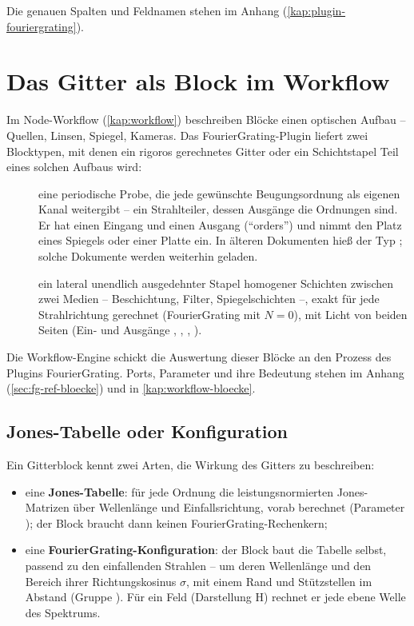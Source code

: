 Die genauen Spalten und Feldnamen stehen im Anhang (\autoref{kap:plugin-fouriergrating}).

\section{Das Gitter als Block im Workflow}\label{sec:fg-block}

Im Node-Workflow (\autoref{kap:workflow}) beschreiben Blöcke einen optischen Aufbau -- Quellen,
Linsen, Spiegel, Kameras. Das FourierGrating-Plugin liefert zwei Blocktypen, mit denen ein
rigoros gerechnetes Gitter oder ein Schichtstapel Teil eines solchen Aufbaus wird:

\begin{description}
  \item[] eine periodische Probe, die jede gewünschte Beugungsordnung als eigenen
    Kanal weitergibt -- ein Strahlteiler, dessen Ausgänge die Ordnungen sind. Er hat einen Eingang
     und einen Ausgang  (\enquote{orders}) und nimmt den Platz eines Spiegels
    oder einer Platte ein. In älteren Dokumenten hieß der Typ ; solche Dokumente
    werden weiterhin geladen.
  \item[] ein lateral unendlich ausgedehnter Stapel homogener Schichten zwischen zwei
    Medien -- Beschichtung, Filter, Spiegelschichten --, exakt für jede Strahlrichtung gerechnet
    (FourierGrating mit $N = 0$), mit Licht von beiden Seiten (Ein- und Ausgänge ,
    , , ).
\end{description}

Die Workflow-Engine schickt die Auswertung dieser Blöcke an den Prozess des Plugins
FourierGrating.
Ports, Parameter und ihre Bedeutung stehen im Anhang (\autoref{sec:fg-ref-bloecke}) und in
\autoref{kap:workflow-bloecke}.

\subsection{Jones-Tabelle oder Konfiguration}

Ein Gitterblock kennt zwei Arten, die Wirkung des Gitters zu beschreiben:

\begin{itemize}
  \item eine \textbf{Jones-Tabelle}: für jede Ordnung die leistungsnormierten Jones-Matrizen über
    Wellenlänge und Einfallsrichtung, vorab berechnet (Parameter ); der Block braucht
    dann keinen FourierGrating-Rechenkern;
  \item eine \textbf{FourierGrating-Konfiguration}: der Block baut die Tabelle selbst, passend zu
    den einfallenden Strahlen -- um deren Wellenlänge und den Bereich ihrer Richtungskosinus
    $\sigma$, mit einem Rand und Stützstellen im Abstand  (Gruppe
    ). Für ein Feld (Darstellung H) rechnet er jede ebene Welle des Spektrums.
\end{itemize}

